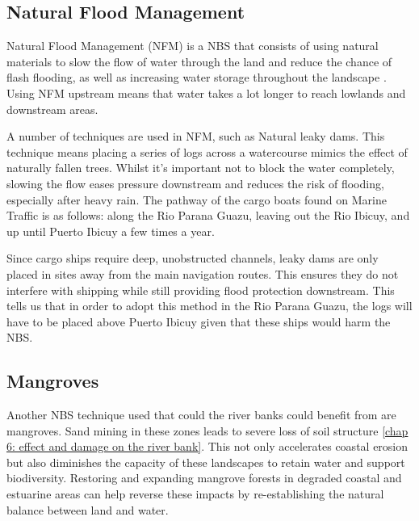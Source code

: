 \subsection{Natural Flood Management}
Natural Flood Management (NFM) is a NBS that consists of using natural materials to slow the flow of water through the land and reduce the chance of flash flooding, as well as increasing water storage throughout the landscape \autocite{therivertrust5EasyWays}. Using NFM upstream means that water takes a lot longer to reach lowlands and downstream areas. 

A number of techniques are used in NFM, such as Natural leaky dams. This technique means placing a series of logs across a watercourse mimics the effect of naturally fallen trees. Whilst it’s important not to block the water completely, slowing the flow eases pressure downstream and reduces the risk of flooding, especially after heavy rain. The pathway of the cargo boats found on Marine Traffic is as follows: along the Rio Parana Guazu, leaving out the Rio Ibicuy, and up until Puerto Ibicuy a few times a year. 

Since cargo ships require deep, unobstructed channels, leaky dams are only placed in sites away from the main navigation routes. This ensures they do not interfere with shipping while still providing flood protection downstream. This tells us that in order to adopt this method in the Rio Parana Guazu, the logs will have to be placed above Puerto Ibicuy given that these ships would harm the NBS. 

\subsection{Mangroves}
Another NBS technique used that could the river banks could benefit from are mangroves.
Sand mining in these zones leads to severe loss of soil structure \ref{chap 6: effect and damage on the river bank}. This not only accelerates coastal erosion but also diminishes the capacity of these landscapes to retain water and support biodiversity. Restoring and expanding mangrove forests in degraded coastal and estuarine areas can help reverse these impacts by re-establishing the natural balance between land and water.

